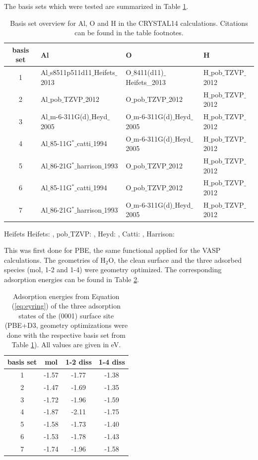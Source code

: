 \documentclass[11pt,DIV=13,BCOR=5mm,a4paper,headinclude]{scrbook}
\begin{document}
The basis sets which were tested are summarized in Table \ref{tab:basissets}.
\begin{table}[!h]
  \centering
   \caption{Basis set overview for Al, O and H in the CRYSTAL14 calculations. Citations can be found in the table footnotes.}
  \begin{tabular}{c|lll}
  \toprule
  basis set & Al & O & H \\\midrule
   1&Al$\_$s8511p511d11$\_$Heifets$\_$2013 & O$\_$8411(d11)$\_$Heifets\_2013&H$\_$pob$\_$TZVP$\_$2012 \\
   2&Al$\_$pob$\_$TZVP$\_$2012 &O$\_$pob$\_$TZVP$\_$2012 & H$\_$pob$\_$TZVP$\_$2012\\
   3&Al$\_$m-6-311G(d)$\_$Heyd$\_$2005 &O$\_$m-6-311G(d)$\_$Heyd$\_$2005 & H$\_$pob$\_$TZVP$\_$2012\\
   4&Al$\_$85-11G$^\ast\_$catti$\_$1994 &O$\_$m-6-311G(d)$\_$Heyd$\_$2005 & H$\_$pob$\_$TZVP$\_$2012\\
   5&Al$\_$86-21G$^\ast\_$harrison$\_$1993 &O$\_$pob$\_$TZVP$\_$2012 & H$\_$pob$\_$TZVP$\_$2012\\
   6&Al$\_$85-11G$^\ast\_$catti$\_$1994 &O$\_$pob$\_$TZVP$\_$2012 & H$\_$pob$\_$TZVP$\_$2012\\
   7&Al$\_$86-21G$^\ast\_$harrison$\_$1993 &O$\_$m-6-311G(d)$\_$Heyd$\_$2005 & H$\_$pob$\_$TZVP$\_$2012\\\bottomrule
  \end{tabular}
  \begin{tablenotes}
 \footnotesize
\item[Heifets] Heifets: \cite{heifets}, pob$\_$TZVP: \cite{pobTZVP}, Heyd: \cite{heyd1,heyd2}, Catti: \cite{catti}, Harrison: \cite{harrison1,harrison2}
\end{tablenotes}
  \label{tab:basissets}
\end{table}
This was first done for PBE, the same functional applied for the VASP calculations.
The geometries of H$_2$O, the clean surface and the three adsorbed species (mol, 1-2 and 1-4) were geometry optimized.
The corresponding adsorption energies can be found in Table \ref{tab:basisset-results-PBE+D3}.
\begin{table}[!h]
  \centering
   \caption{Adsorption energies from Equation (\ref{eq:eyring}) of the three adsorption states of the (0001) surface site (PBE+D3, geometry optimizations were done with the respective basis set from Table \ref{tab:basissets}).
All values are given in eV.}
  \begin{tabular}{c|ccc}
  \toprule
  basis set & mol & 1-2 diss & 1-4 diss \\\midrule
  1 &-1.57 &-1.77 &-1.38 \\
  2 &-1.47 &-1.69 &-1.35 \\
  3 &-1.72 &-1.96 &-1.59 \\
  4 &-1.87 &-2.11 &-1.75 \\
  5 &-1.58 &-1.73 &-1.40 \\
  6 &-1.53 &-1.78 &-1.43 \\
  7 &-1.74 &-1.96 &-1.58 \\\bottomrule  
  \end{tabular}
  \label{tab:basisset-results-PBE+D3}
\end{table}
\end{document}
